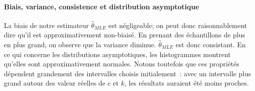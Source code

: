 \paragraph{Biais, variance, consistence et distribution asymptotique}
La biais de notre estimateur $\hat{\theta}_{MLE}$ est négligeable; on peut donc raisonnablement dire qu'il est approximativement non-biaisé. En prenant des échantillons de plus en plus grand, on observe que la variance diminue. $\hat{\theta}_{MLE}$ est donc consistant.
En ce qui concerne les distributions asymptotiques, les histogrammes montrent qu'elles sont approximativement normales. Notons toutefois que ces propriétés dépendent grandement des intervalles choisis initialement~: avec un intervalle plus grand autour des valeur réelles de $c$ et $k$, les résultats auraient été moins proches.


